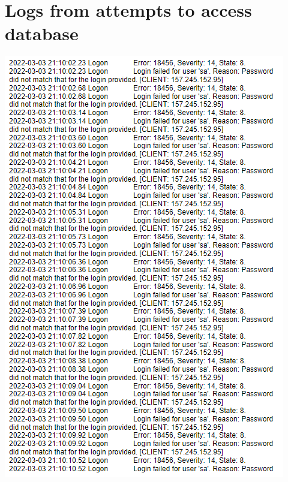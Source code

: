 \section{Logs from attempts to access database}
\begin{center}
    \includegraphics[width = \textwidth]{Images/database_access_logs.png}
\end{center}